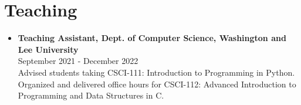 \section*{Teaching}
\begin{itemize}[leftmargin=*]
    \item \textbf{Teaching Assistant, Dept. of Computer Science, Washington and Lee University} \\
    September 2021 - December 2022 \\
    Advised students taking CSCI-111: Introduction to Programming in Python. Organized and delivered office hours for CSCI-112: Advanced Introduction to Programming and Data Structures in C.
\end{itemize}